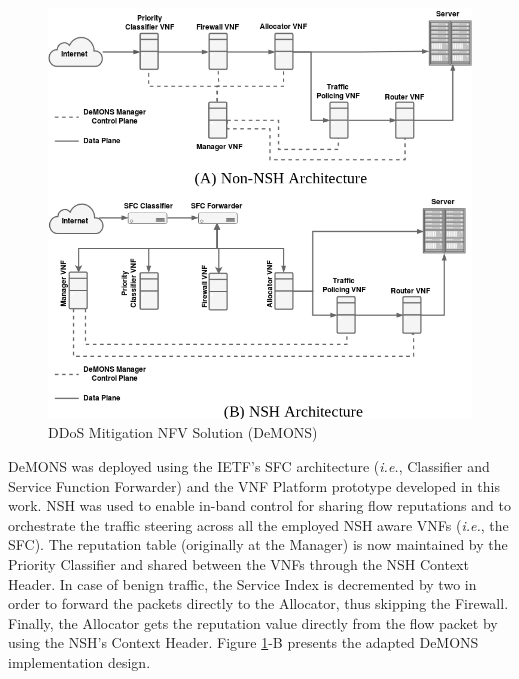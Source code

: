 \begin{figure}[!h]
\centering
\includegraphics[width=.7\textwidth]{images/DeMONS.png}
\caption{DDoS Mitigation NFV Solution (DeMONS)}
\label{FIG:DeMONS}
\end{figure}


DeMONS was deployed using the IETF's SFC architecture (\textit{i.e.}, Classifier and Service Function Forwarder) \cite{Joel-2015} and the VNF Platform prototype developed in this work. NSH was used to enable in-band control for sharing flow reputations and to orchestrate the traffic steering across all the employed NSH aware VNFs (\textit{i.e.}, the SFC). The reputation table (originally at the Manager) is now maintained by the Priority Classifier and shared between the VNFs through the NSH Context Header. In case of benign traffic, the Service Index is decremented by two in order to forward the packets directly to the Allocator, thus skipping the Firewall. Finally, the Allocator gets the reputation value directly from the flow packet by using the NSH's Context Header. Figure \ref{FIG:DeMONS}-B presents the adapted DeMONS implementation design.


